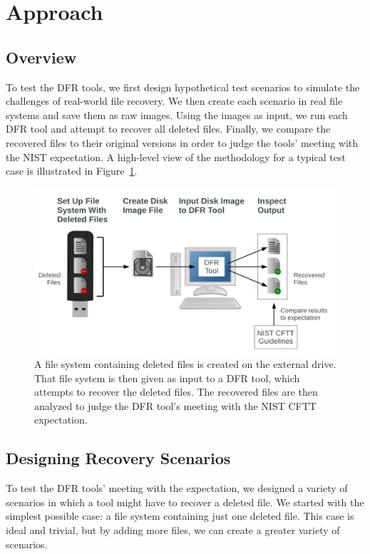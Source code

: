 \section{Approach}

\subsection{Overview}

To test the DFR tools, we first design hypothetical test scenarios to simulate the challenges of real-world file recovery.
We then create each scenario in real file systems and save them as raw images. 
Using the images as input, we run each DFR tool and attempt to recover all deleted files. 
Finally, we compare the recovered files to their original versions in order to judge the tools' 
meeting with the NIST expectation. A high-level view of the methodology for a typical test case is illustrated in Figure~\ref{fig:overview}.

\begin{figure}[h]
    \centering
    \includegraphics[width=\linewidth]{fig/overview.pdf}
    \caption{A file system containing deleted files is created on the external drive. 
That file system is then given as input to a DFR tool, which attempts to recover the deleted files. 
The recovered files are then analyzed to judge the DFR tool's meeting with the NIST CFTT expectation.}
    \label{fig:overview}
\end{figure}

\subsection{Designing Recovery Scenarios}
To test the DFR tools' meeting with the expectation, we designed a variety of scenarios in which a tool might have to recover a deleted file. 
We started with the simplest possible case: a file system containing just one deleted file. 
This case is ideal and trivial, but by adding more files, we can create a greater variety of scenarios.

